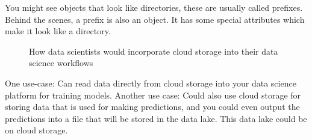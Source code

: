 You might see objects that look like directories, these are usually called prefixes.
Behind the scenes, a prefix is also an object.
It has some special attributes which make it look like a directory.
\begin{figure}[ht]
    \centering
    \caption{How data scientists would incorporate cloud storage into their data science workflows}
    \label{fig:cloud storage}
\end{figure}

One use-case: Can read data directly from cloud storage into your data science platform for training models.
Another use case: Could also use cloud storage for storing data that is used for making predictions, and you could even output the predictions into a file that will be stored in the data lake.
This data lake could be on cloud storage.

